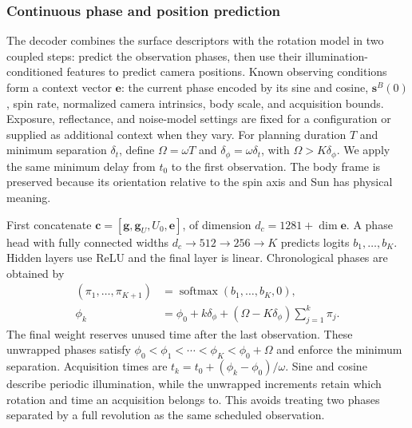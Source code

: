 \subsubsection{Continuous phase and position prediction}
\label{subsubsec:planner-decoder}

The decoder combines the surface descriptors with the rotation model in two coupled steps: predict the observation phases, then use their illumination-conditioned features to predict camera positions. Known observing conditions form a context vector $\mathbf e$: the current phase encoded by its sine and cosine, $\mathbf s^B(0)$, spin rate, normalized camera intrinsics, body scale, and acquisition bounds. Exposure, reflectance, and noise-model settings are fixed for a configuration or supplied as additional context when they vary. For planning duration $T$ and minimum separation $\delta_t$, define $\Omega=\omega T$ and $\delta_\phi=\omega\delta_t$, with $\Omega>K\delta_\phi$. We apply the same minimum delay from $t_0$ to the first observation. The body frame is preserved because its orientation relative to the spin axis and Sun has physical meaning.

First concatenate $\mathbf c=[\mathbf g,\mathbf g_U,U_0,\mathbf e]$, of dimension $d_c=1281+\dim\mathbf e$. A phase head with fully connected widths $d_c\to512\to256\to K$ predicts logits $b_1,\ldots,b_K$. Hidden layers use ReLU and the final layer is linear. Chronological phases are obtained by
\begin{equation}
    \begin{aligned}
        (\pi_1,\ldots,\pi_{K+1})&=\operatorname{softmax}(b_1,\ldots,b_K,0),\\
        \phi_k&=\phi_0+k\delta_\phi
          +(\Omega-K\delta_\phi)\sum_{j=1}^{k}\pi_j.
    \end{aligned}
    \label{eq:planner-phase-sequence}
\end{equation}
The final weight reserves unused time after the last observation. These unwrapped phases satisfy $\phi_0<\phi_1<\cdots<\phi_K<\phi_0+\Omega$ and enforce the minimum separation. Acquisition times are $t_k=t_0+(\phi_k-\phi_0)/\omega$. Sine and cosine describe periodic illumination, while the unwrapped increments retain which rotation and time an acquisition belongs to. This avoids treating two phases separated by a full revolution as the same scheduled observation.

